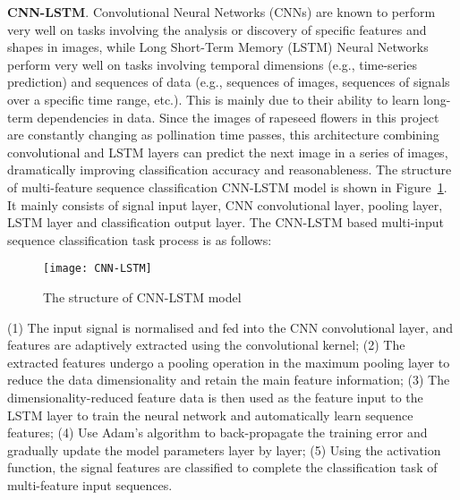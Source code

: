 \documentclass[11pt,a4paper]{article}
\begin{document}
\begin{spacing}{1.5}
\textbf{CNN-LSTM}.
Convolutional Neural Networks (CNNs) are known to perform very well on tasks involving the analysis or discovery of specific features and shapes in images, while Long Short-Term Memory (LSTM) Neural Networks perform very well on tasks involving temporal dimensions (e.g., time-series prediction) and sequences of data (e.g., sequences of images, sequences of signals over a specific time range, etc.).
This is mainly due to their ability to learn long-term dependencies in data. Since the images of rapeseed flowers in this project are constantly changing as pollination time passes, this architecture combining convolutional and LSTM layers can predict the next image in a series of images, dramatically improving classification accuracy and reasonableness.
The structure of multi-feature sequence classification CNN-LSTM model is shown in Figure~\ref{CNN-LSTM}. It mainly consists of signal input layer, CNN convolutional layer, pooling layer, LSTM layer and classification output layer. The CNN-LSTM based multi-input sequence classification task process is as follows:

\begin{figure}[ht]
	\centering
	\texttt{[image: CNN-LSTM]}
	\caption{The structure of CNN-LSTM model \citet{inproceedings}}
	\label{CNN-LSTM}
\end{figure}

(1) The input signal is normalised and fed into the CNN convolutional layer, and features are adaptively extracted using the convolutional kernel;
(2) The extracted features undergo a pooling operation in the maximum pooling layer to reduce the data dimensionality and retain the main feature information;
(3) The dimensionality-reduced feature data is then used as the feature input to the LSTM layer to train the neural network and automatically learn sequence features;
(4) Use Adam's algorithm to back-propagate the training error and gradually update the model parameters layer by layer;
(5) Using the activation function, the signal features are classified to complete the classification task of multi-feature input sequences.


\end{spacing}
\end{document}
